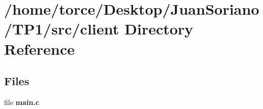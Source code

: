 \section{/home/torce/\+Desktop/\+Juan\+Soriano/\+T\+P1/src/client Directory Reference}
\label{dir_3d441b6012196897f3853c15d2b17da2}
\subsection*{Files}
\begin{DoxyCompactItemize}
\item 
file {\bf main.\+c}
\end{DoxyCompactItemize}
